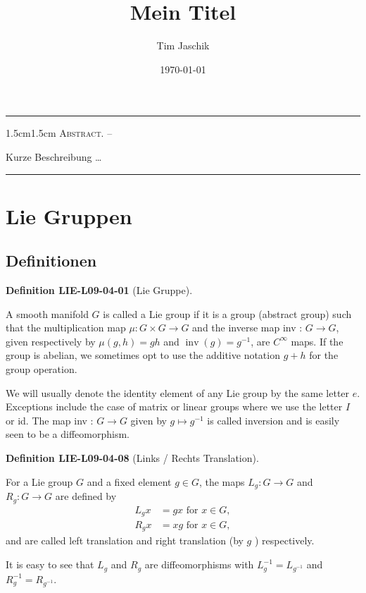 \documentclass[10pt, letterpaper]{article}
\title{Mein Titel}
\author{Tim Jaschik}
\date{\today}
\renewenvironment{abstract}
  {
    \begin{adjustwidth}{1.5cm}{1.5cm}
    \small
    \textsc{Abstract. –}%
  }
  {
    \end{adjustwidth}
  }
\newcommand{\CustomHeading}[3]{%
  \par\medskip\noindent%
  \textbf{#1 #2} \textnormal{(#3)}.\enskip%
}
\newenvironment{DEF}[2]{\CustomHeading{Definition}{#1}{#2}}{}
\begin{document}
\maketitle
\rule{\textwidth}{0.5pt}
\begin{abstract}
Kurze Beschreibung …
\end{abstract}
\rule{\textwidth}{0.5pt}
\vspace{0.5cm}

\tableofcontents

\pagebreak

\section{Lie Gruppen}

\subsection{Definitionen}

\begin{DEF}{LIE-L09-04-01}{Lie Gruppe}
A smooth manifold $G$ is called a Lie group if it is a group (abstract group) such that the multiplication map $\mu: G \times G \rightarrow G$ and the inverse map inv : $G \rightarrow G$, given respectively by $\mu(g, h)=g h$ and $\operatorname{inv}(g)=g^{-1}$, are $C^{\infty}$ maps. If the group is abelian, we sometimes opt to use the additive notation $g+h$ for the group operation.

We will usually denote the identity element of any Lie group by the same letter $e$. Exceptions include the case of matrix or linear groups where we use the letter $I$ or id. The map inv : $G \rightarrow G$ given by $g \mapsto g^{-1}$ is called inversion and is easily seen to be a diffeomorphism.
\end{DEF}

\begin{DEF}{LIE-L09-04-08}{Links / Rechts Translation}
For a Lie group $G$ and a fixed element $g \in G$, the maps $L_{g}: G \rightarrow G$ and $R_{g}: G \rightarrow G$ are defined by
$$
\begin{aligned}
L_{g} x & =g x \text { for } x \in G, \\
R_{g} x & =x g \text { for } x \in G,
\end{aligned}
$$
and are called left translation and right translation (by $g$ ) respectively.

It is easy to see that $L_{g}$ and $R_{g}$ are diffeomorphisms with $L_{g}^{-1}=L_{g^{-1}}$ and $R_{g}^{-1}=R_{g^{-1}}$.
\end{DEF}
\end{document}
